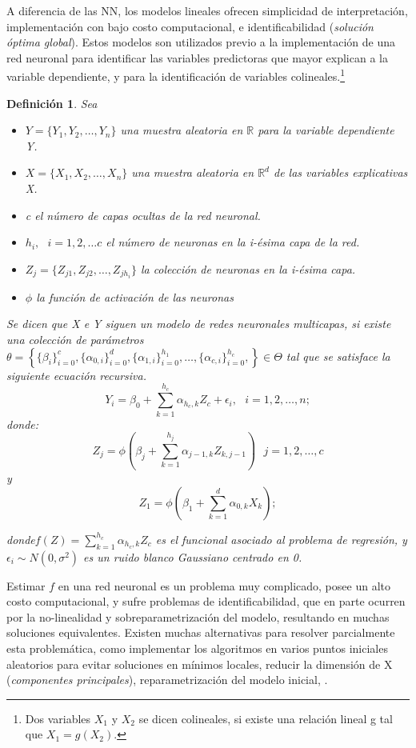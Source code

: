 \documentclass[nojss]{jss}
\newtheorem{Def}{Definición}
\begin{document}
 
A diferencia de las NN, los modelos lineales ofrecen simplicidad de interpretación, implementación con bajo costo computacional, e identificabilidad (\textit{solución óptima global}). Estos modelos son utilizados previo a la implementación de una red neuronal para identificar las variables predictoras que mayor explican a la variable dependiente, y para la identificación de variables colineales.\footnote{Dos variables $X_1$ y $X_2$ se dicen colineales, si existe una relación lineal g tal que $X_1 = g(X_2)$.}

\begin{Def}
	Sea
	\begin{itemize}
		\item $Y = \{Y_1,Y_2,\ldots,Y_n\}$ una muestra aleatoria en $\mathbb{R}$ para la variable dependiente Y.
		\item $X = \{X_1,X_2,\ldots,X_n\}$ una muestra aleatoria en $\mathbb{R}^d$ de las variables explicativas X.
		\item  c el número de capas ocultas de la red neuronal.
		\item $h_i,\text{ } i = 1,2,\ldots c$ el número de neuronas  en la i-ésima capa de la red.
		\item $Z_j = \{Z_{j1},Z_{j2},\ldots, Z_{jh_i}\}$ la colección de neuronas en la i-ésima capa.
		\item $\phi$ la función de activación de las neuronas
	\end{itemize}
	 
	Se dicen que X e Y siguen un modelo de redes neuronales multicapas, si existe una colección de parámetros $\theta = \left\{ \{\beta_i\}_{i=0}^{c},\{\alpha_{0,i}\}_{i=0}^{d},\{\alpha_{1,i}\}_{i=0}^{h_1},\ldots, \{\alpha_{c,i}\}_{i=0}^{h_c}, \right\} \in \Theta$ tal que se satisface la siguiente ecuación recursiva.
	$$Y_i = \beta_{0} + \sum_{k=1}^{h_c} \alpha_{h_c,k} Z_c +\epsilon_i, \text{ } i = 1,2,\ldots,n;$$
	donde: 
	$$Z_{j} = \phi\left(\beta_j +\sum_{k=1}^{h_j}\alpha_{j-1,k}Z_{k,j-1}\right)\text{ } j = 1,2,\ldots,c$$
	y 
	$$Z_{1} = \phi\left(\beta_1 +\sum_{k=1}^{d}\alpha_{0,k}X_{k}\right);$$
	
	donde$f(Z) = \sum_{k=1}^{h_c} \alpha_{h_c,k} Z_c$ es el funcional asociado al problema de regresión, y  $\epsilon_i \sim N(0,\sigma^2)$ es un ruido blanco Gaussiano centrado en 0.
\end{Def}

Estimar $f$ en una red neuronal es un problema muy complicado, posee un alto costo computacional, y sufre problemas de identificabilidad, que en parte ocurren por la no-linealidad y sobreparametrización del modelo, resultando en muchas soluciones equivalentes. Existen muchas alternativas para resolver parcialmente esta problemática, como implementar los algoritmos en varios puntos iniciales aleatorios para evitar soluciones en mínimos locales, reducir la dimensión de X (\textit{componentes principales}), reparametrización del modelo inicial, \cite{Arya2017}.\\
\end{document}
